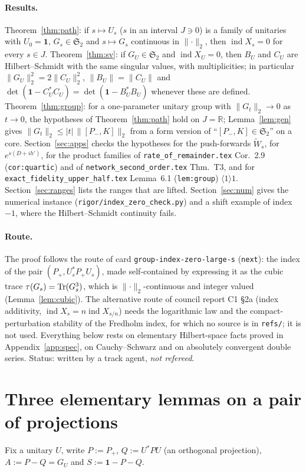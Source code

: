 \documentclass[11pt]{article}
\newcommand{\Wt}{\widetilde W}
\newcommand{\Stwo}{\mathfrak S_2}
\newcommand{\Pp}{P_+}\newcommand{\Pm}{P_-}
\newcommand{\one}{\mathbf 1}
\newcommand{\norm}[1]{\lVert#1\rVert}
\newcommand{\abs}[1]{\lvert#1\rvert}
\newcommand{\ind}{\operatorname{ind}}
\begin{document}
\paragraph{Results.}
Theorem~\ref{thm:path}: if $s\mapsto U_s$ ($s$ in an interval $J\ni0$) is a family of unitaries with $U_0=\one$,
$G_s\in\Stwo$ and $s\mapsto G_s$ continuous in $\norm\cdot_2$, then $\ind X_s=0$ for every $s\in J$.
Theorem~\ref{thm:sv}: if $G_U\in\Stwo$ and $\ind X_U=0$, then $B_U$ and $C_U$ are Hilbert--Schmidt with the same
singular values, with multiplicities; in particular $\norm{G_U}_2^2=2\norm{C_U}_2^2$, $\norm{B_U}=\norm{C_U}$ and
$\det(\one-C_U^*C_U)=\det(\one-B_U^*B_U)$ whenever these are defined.
Theorem~\ref{thm:group}: for a one-parameter unitary group with $\norm{G_t}_2\to0$ as $t\to0$, the hypotheses of
Theorem~\ref{thm:path} hold on $J=\mathbb R$; Lemma~\ref{lem:gen} gives $\norm{G_t}_2\le\abs t\,\norm{[\Pm,K]}_2$
from a form version of ``$[\Pm,K]\in\Stwo$'' on a core.  Section~\ref{sec:apps} checks the hypotheses for the
push-forwards $\Wt_s$, for $e^{s(D+ih')}$, for the product families of \texttt{rate\_of\_remainder.tex}
Cor.~2.9 (\texttt{cor:quartic}) and of \texttt{network\_second\_order.tex} Thm.~T3, and for
\texttt{exact\_fidelity\_upper\_half.tex} Lemma~6.1 (\texttt{lem:group}) $\langle1\rangle1$.
Section~\ref{sec:ranges} lists the ranges that are lifted.  Section~\ref{sec:num} gives the numerical instance
(\texttt{rigor/index\_zero\_check.py}) and a shift example of index $-1$, where the Hilbert--Schmidt
continuity fails.

\paragraph{Route.}  The proof follows the route of card \texttt{group-index-zero-large-s} (\texttt{next}): the
index of the pair $(\Pp,U_s^*\Pp U_s)$, made self-contained by expressing it as the cubic trace
$\tau(G_s)=\operatorname{Tr}(G_s^3)$, which is $\norm\cdot_2$-continuous and integer valued (Lemma~\ref{lem:cubic}).
The alternative route of council report C1 \S2a (index additivity, $\ind X_s=n\ind X_{s/n}$) needs the
logarithmic law and the compact-perturbation stability of the Fredholm index, for which no source is in
\texttt{refs/}; it is not used.  Everything below rests on elementary Hilbert-space facts proved in
Appendix~\ref{app:spec}, on Cauchy--Schwarz and on absolutely convergent double series.
Status: written by a track agent, \emph{not refereed}.

\section{Three elementary lemmas on a pair of projections}\label{sec:pair}
Fix a unitary $U$, write $P:=\Pp$, $Q:=U^*PU$ (an orthogonal projection), $A:=P-Q=G_U$ and $S:=\one-P-Q$.
\end{document}
